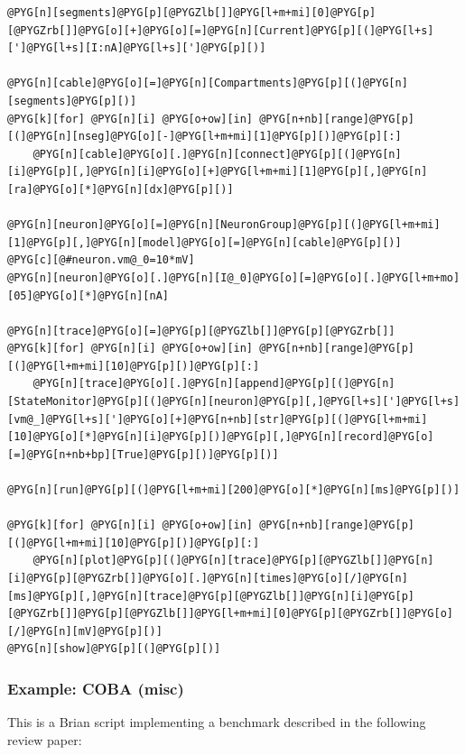\documentclass[letterpaper,10pt,english]{manual}
\begin{document}
\begin{Verbatim}[commandchars=@\[\]]
@PYG[n][segments]@PYG[p][@PYGZlb[]]@PYG[l+m+mi][0]@PYG[p][@PYGZrb[]]@PYG[o][+]@PYG[o][=]@PYG[n][Current]@PYG[p][(]@PYG[l+s][']@PYG[l+s][I:nA]@PYG[l+s][']@PYG[p][)]

@PYG[n][cable]@PYG[o][=]@PYG[n][Compartments]@PYG[p][(]@PYG[n][segments]@PYG[p][)]
@PYG[k][for] @PYG[n][i] @PYG[o+ow][in] @PYG[n+nb][range]@PYG[p][(]@PYG[n][nseg]@PYG[o][-]@PYG[l+m+mi][1]@PYG[p][)]@PYG[p][:]
    @PYG[n][cable]@PYG[o][.]@PYG[n][connect]@PYG[p][(]@PYG[n][i]@PYG[p][,]@PYG[n][i]@PYG[o][+]@PYG[l+m+mi][1]@PYG[p][,]@PYG[n][ra]@PYG[o][*]@PYG[n][dx]@PYG[p][)]

@PYG[n][neuron]@PYG[o][=]@PYG[n][NeuronGroup]@PYG[p][(]@PYG[l+m+mi][1]@PYG[p][,]@PYG[n][model]@PYG[o][=]@PYG[n][cable]@PYG[p][)]
@PYG[c][@#neuron.vm@_0=10*mV]
@PYG[n][neuron]@PYG[o][.]@PYG[n][I@_0]@PYG[o][=]@PYG[o][.]@PYG[l+m+mo][05]@PYG[o][*]@PYG[n][nA]

@PYG[n][trace]@PYG[o][=]@PYG[p][@PYGZlb[]]@PYG[p][@PYGZrb[]]
@PYG[k][for] @PYG[n][i] @PYG[o+ow][in] @PYG[n+nb][range]@PYG[p][(]@PYG[l+m+mi][10]@PYG[p][)]@PYG[p][:]
    @PYG[n][trace]@PYG[o][.]@PYG[n][append]@PYG[p][(]@PYG[n][StateMonitor]@PYG[p][(]@PYG[n][neuron]@PYG[p][,]@PYG[l+s][']@PYG[l+s][vm@_]@PYG[l+s][']@PYG[o][+]@PYG[n+nb][str]@PYG[p][(]@PYG[l+m+mi][10]@PYG[o][*]@PYG[n][i]@PYG[p][)]@PYG[p][,]@PYG[n][record]@PYG[o][=]@PYG[n+nb+bp][True]@PYG[p][)]@PYG[p][)]

@PYG[n][run]@PYG[p][(]@PYG[l+m+mi][200]@PYG[o][*]@PYG[n][ms]@PYG[p][)]

@PYG[k][for] @PYG[n][i] @PYG[o+ow][in] @PYG[n+nb][range]@PYG[p][(]@PYG[l+m+mi][10]@PYG[p][)]@PYG[p][:]
    @PYG[n][plot]@PYG[p][(]@PYG[n][trace]@PYG[p][@PYGZlb[]]@PYG[n][i]@PYG[p][@PYGZrb[]]@PYG[o][.]@PYG[n][times]@PYG[o][/]@PYG[n][ms]@PYG[p][,]@PYG[n][trace]@PYG[p][@PYGZlb[]]@PYG[n][i]@PYG[p][@PYGZrb[]]@PYG[p][@PYGZlb[]]@PYG[l+m+mi][0]@PYG[p][@PYGZrb[]]@PYG[o][/]@PYG[n][mV]@PYG[p][)]
@PYG[n][show]@PYG[p][(]@PYG[p][)]
\end{Verbatim}

\resetcurrentobjects
\hypertarget{--doc-examples-misc_COBA}{}

\hypertarget{index-32}{}\subsubsection{Example: COBA (misc)}

This is a Brian script implementing a benchmark described
in the following review paper:
\end{document}
